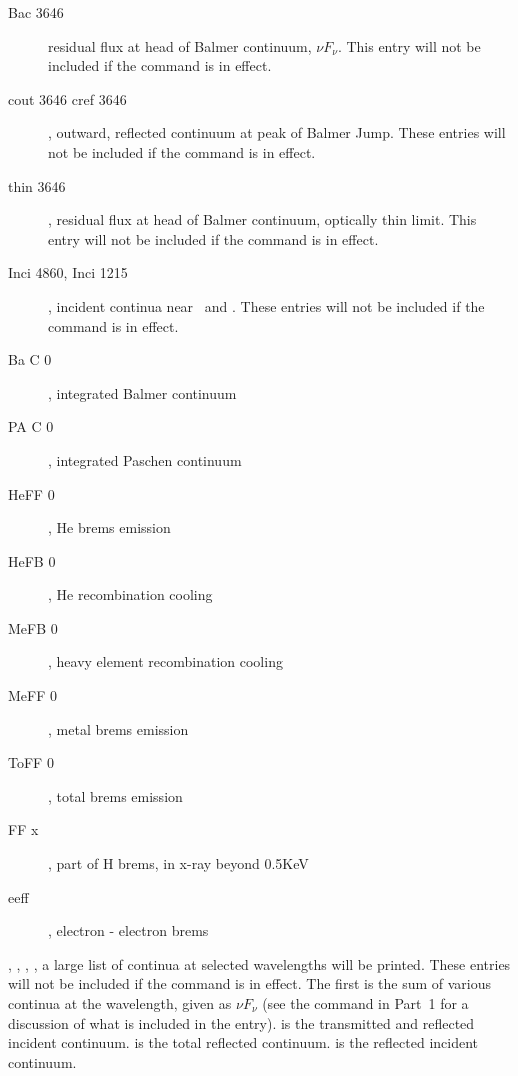 \begin{description}
\item[Bac  3646]  residual flux at head of Balmer
continuum, $\nu F_\nu$. This entry will not be included if the 
command is in effect.

\item[cout 3646 cref 3646], outward, reflected continuum at peak of Balmer Jump.
These entries will not be included if the  command is in effect.

\item[thin 3646], residual flux at head of Balmer continuum, optically thin limit.
This entry will not be included if the  command is in effect.

\item[Inci 4860, Inci 1215], incident continua near \ha\ and \la.
These entries will not be included if the  command is in effect.

\item[Ba C    0], integrated Balmer continuum

\item[PA C    0], integrated Paschen continuum

\item[HeFF    0], He brems emission

\item[HeFB    0], He recombination cooling

\item[MeFB    0], heavy element recombination cooling

\item[MeFF    0], metal brems emission

\item[ToFF    0], total brems emission

\item[FF x], part of H brems, in x-ray beyond 0.5KeV

\item[eeff], electron - electron brems
\end{description}

,
,
,
,
a large list of continua
at selected wavelengths will be printed.
These entries will not be included if the  command is in effect.
The first is the sum of various continua at the wavelength,
given as $\nu F_\nu$ (see the  command
in Part~1 for a discussion of what is included in the  entry).
 is the transmitted and reflected incident continuum.
 is the total reflected continuum.
 is the reflected incident
continuum.

